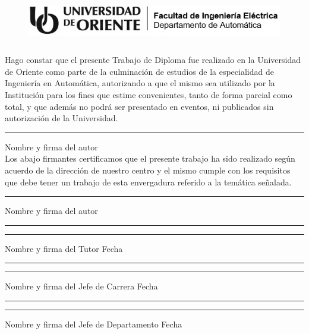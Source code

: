 \thispagestyle{empty}

\begin{figure}[h]
    \centering
    \includegraphics[width=15cm, height=2cm]{imagenes/identidad en blanco y negro.jpg}
\end{figure}

\vspace{0.5cm}

Hago constar que el presente Trabajo de Diploma fue realizado en la Universidad de Oriente como parte de la culminación de estudios de la especialidad de Ingeniería en Automática, autorizando a que el mismo sea utilizado por la Institución para los fines que estime convenientes, tanto de forma parcial como total, y que además no podrá ser presentado en eventos, ni publicados sin autorización de la Universidad.\\

\hspace{2.5cm}
\rule{11cm}{1pt}

\hspace{6cm}
Nombre y firma del autor\\

Los abajo firmantes certificamos que el presente trabajo ha sido realizado según acuerdo de la dirección de nuestro centro y el mismo cumple con los requisitos que debe tener un trabajo de esta envergadura referido a la temática señalada.\\

\hspace{2.5cm}
\rule{11cm}{1pt}

\hspace{6cm}
Nombre y firma del autor\\

\vspace{1.5cm}

\rule{8cm}{1pt}
\hspace{4.3cm}
\rule{3cm}{1pt}

\hspace{1.8cm}
Nombre y firma del Tutor
\hspace{7cm}
Fecha

\vspace{1cm}

\rule{8cm}{1pt}
\hspace{4.3cm}
\rule{3cm}{1pt}

\hspace{0.7cm}
Nombre y firma del Jefe de Carrera
\hspace{6.2cm}
Fecha

\vspace{1cm}

\rule{8cm}{1pt}
\hspace{4.3cm}
\rule{3cm}{1pt}

\hspace{0.2cm}
Nombre y firma del Jefe de Departamento
\hspace{5.5cm}
Fecha

